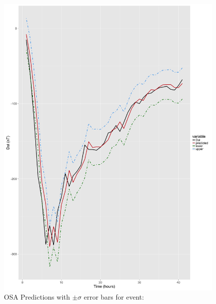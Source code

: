 \documentclass[sw, draft]{AGUTeX}
\begin{document}
\begin{figure}
\noindent\includegraphics[width=\textwidth]{PredictionsModel1/PredErrBars_Storm14.png}
\caption{OSA Predictions with $\pm \sigma$ error bars for event: }
\label{fig:ComparePred54}
\end{figure}


%
%
\end{document}
